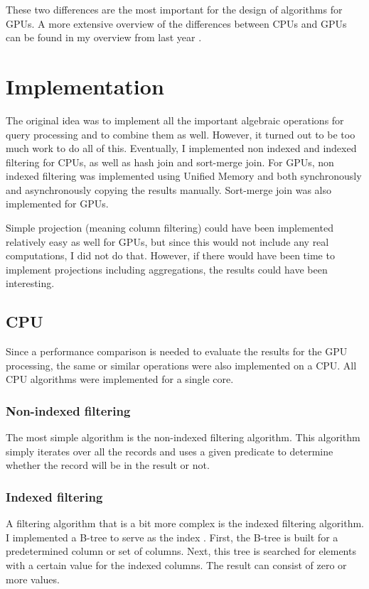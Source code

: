 \documentclass[a4paper,titlepage]{article}
\begin{document}
These two differences are the most important for the design of algorithms for GPUs. A more extensive overview of the differences between CPUs and GPUs can be found in my overview from last year \cite{kostjens2015}.

\section{Implementation}
\label{sec:implementation}
The original idea was to implement all the important algebraic operations for query processing and to combine them as well. However, it turned out to be too much work to do all of this. Eventually, I implemented non indexed and indexed filtering for CPUs, as well as hash join and sort-merge join. For GPUs, non indexed filtering was implemented using Unified Memory and both synchronously and asynchronously copying the results manually. Sort-merge join was also implemented for GPUs.

Simple projection (meaning column filtering) could have been implemented relatively easy as well for GPUs, but since this would not include any real computations, I did not do that. However, if there would have been time to implement projections including aggregations, the results could have been interesting.

\subsection{CPU}
Since a performance comparison is needed to evaluate the results for the GPU processing, the same or similar operations were also implemented on a CPU. All CPU algorithms were implemented for a single core.

\subsubsection{Non-indexed filtering}
The most simple algorithm is the non-indexed filtering algorithm. This algorithm simply iterates over all the records and uses a given predicate to determine whether the record will be in the result or not.

\subsubsection{Indexed filtering}
A filtering algorithm that is a bit more complex is the indexed filtering algorithm. I implemented a B-tree to serve as the index \cite{comer1979}. First, the B-tree is built for a predetermined column or set of columns. Next, this tree is searched for elements with a certain value for the indexed columns. The result can consist of zero or more values.
\end{document}
